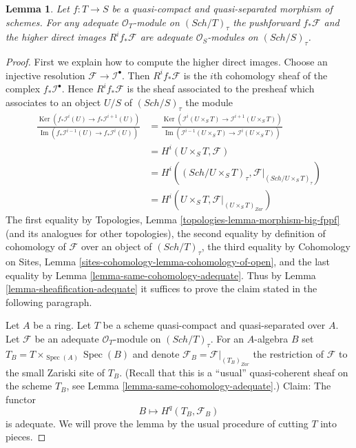 \documentclass{stacks-project}
\theoremstyle{plain}
\newtheorem{lemma}[subsection]{Lemma}
\theoremstyle{definition}
\theoremstyle{remark}
\numberwithin{equation}{subsection}
\def\Spec{\mathop{\mathrm{Spec}}}
\def\Sch{\mathit{Sch}}
\def\Ker{\mathop{\mathrm{Ker}}}
\def\Im{\mathop{\mathrm{Im}}}
\begin{document}
\begin{lemma}
\label{lemma-direct-image-adequate}
Let $f : T \to S$ be a quasi-compact and quasi-separated morphism
of schemes. For any adequate $\mathcal{O}_T$-module on
$(\Sch/T)_\tau$ the pushforward
$f_*\mathcal{F}$ and the higher direct images $R^if_*\mathcal{F}$
are adequate $\mathcal{O}_S$-modules on $(\Sch/S)_\tau$.
\end{lemma}

\begin{proof}
First we explain how to compute the higher direct images.
Choose an injective resolution $\mathcal{F} \to \mathcal{I}^\bullet$.
Then $R^if_*\mathcal{F}$ is the $i$th cohomology sheaf of the
complex $f_*\mathcal{I}^\bullet$.
Hence $R^if_*\mathcal{F}$ is the sheaf associated to the presheaf
which associates to an object $U/S$ of $(\Sch/S)_\tau$
the module
\begin{align*}
\frac{\Ker(f_*\mathcal{I}^i(U) \to f_*\mathcal{I}^{i + 1}(U))}
{\Im(f_*\mathcal{I}^{i - 1}(U) \to f_*\mathcal{I}^i(U))}
& =
\frac{\Ker(\mathcal{I}^i(U \times_S T) \to
\mathcal{I}^{i + 1}(U \times_S T))}
{\Im(\mathcal{I}^{i - 1}(U \times_S T) \to \mathcal{I}^i(U \times_S T))}
\\
& =
H^i(U \times_S T, \mathcal{F}) \\
& = H^i((\Sch/U \times_S T)_\tau,
\mathcal{F}|_{(\Sch/U \times_S T)_\tau}) \\
& = H^i(U \times_S T, \mathcal{F}|_{(U \times_S T)_{Zar}})
\end{align*}
The first equality by
Topologies, Lemma \ref{topologies-lemma-morphism-big-fppf}
(and its analogues for other topologies),
the second equality by definition of cohomology of $\mathcal{F}$
over an object of $(\Sch/T)_\tau$,
the third equality by
Cohomology on Sites, Lemma \ref{sites-cohomology-lemma-cohomology-of-open},
and the last equality by
Lemma \ref{lemma-same-cohomology-adequate}.
Thus by
Lemma \ref{lemma-sheafification-adequate}
it suffices to prove the claim stated in the following paragraph.

\medskip\noindent
Let $A$ be a ring. Let $T$ be a scheme quasi-compact and quasi-separated
over $A$. Let $\mathcal{F}$ be an adequate $\mathcal{O}_T$-module on
$(\Sch/T)_\tau$. For an $A$-algebra $B$ set
$T_B = T \times_{\Spec(A)} \Spec(B)$ and denote
$\mathcal{F}_B = \mathcal{F}|_{(T_B)_{Zar}}$ the restriction of
$\mathcal{F}$ to the small Zariski site of $T_B$.
(Recall that this is a ``usual'' quasi-coherent sheaf on the scheme
$T_B$, see
Lemma \ref{lemma-same-cohomology-adequate}.)
Claim: The functor
$$
B \longmapsto H^q(T_B, \mathcal{F}_B)
$$
is adequate. We will prove the lemma by the usual
procedure of cutting $T$ into pieces.


\end{proof}
\end{document}
